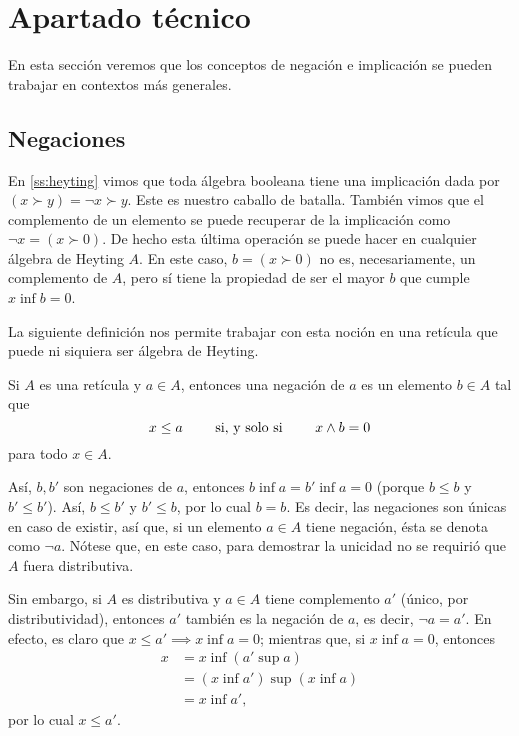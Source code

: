 \section{Apartado técnico}

En esta sección veremos que los conceptos de negación e implicación se
pueden trabajar en contextos más generales.

\subsection{Negaciones}\label{ss:negaciones}

En \ref{ss:heyting} vimos que toda álgebra booleana tiene una
implicación dada por $(x\succ y)=\neg x\succ y$. Este es nuestro
caballo de batalla. También vimos que el complemento de un elemento se
puede recuperar de la implicación como $\neg x = (x\succ 0)$.
De hecho esta última operación se puede hacer en cualquier álgebra de
Heyting $A$. En este caso, $b=(x\succ 0)$ no es, necesariamente, un
complemento de $A$, pero sí tiene la propiedad de ser el mayor
$b$ que cumple $x\inf b=0$.

La siguiente definición nos permite trabajar con esta noción en una
retícula que puede ni siquiera ser álgebra de Heyting.

\begin{definition}[Negaciones]
  Si $A$ es una retícula y $a\in A$,
  entonces una negación de $a$ es un elemento $b\in A$ tal que
  \[
      x\leq a \qquad\text{ si, y solo si }\qquad x\wedge b=0
  \]
  para todo $x\in A$.
\end{definition}
Así, $b,b'$ son negaciones de $a$,
entonces $b\inf a=b'\inf a=0$ (porque $b\leq b$ y $b'\leq b'$).
Así, $b\leq b'$ y $b'\leq b$, por lo cual $b=b$.
Es decir, las negaciones son únicas en caso de existir, así que,
si un elemento $a\in A$ tiene negación,
ésta se denota como $\neg a$.
Nótese que, en este caso, para demostrar la unicidad
no se requirió que $A$ fuera distributiva.

Sin embargo, si $A$ es distributiva
y $a\in A$ tiene complemento $a'$ (único, por distributividad),
entonces $a'$ también es la negación de $a$, es decir, $\neg a=a'$.
En efecto, es claro que $x\leq a'\implies x\inf a=0$;
mientras que, si $x\inf a=0$, entonces
\begin{align*}
    x
    &= x\inf(a'\sup a) \\
    &= (x\inf a')\sup (x\inf a) \\
    &= x\inf a',
\end{align*}
por lo cual $x\leq a'$.


